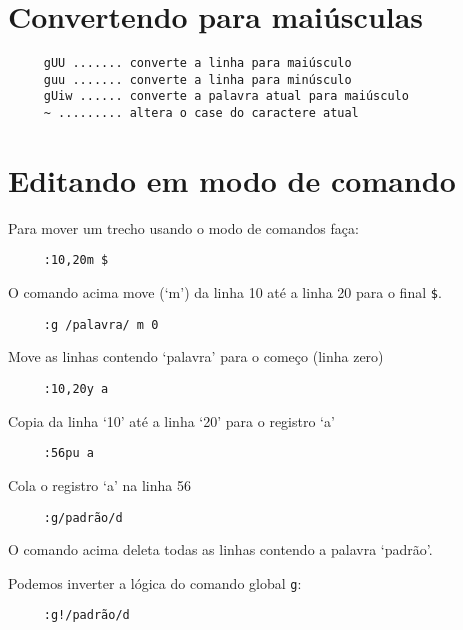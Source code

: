 \section{Convertendo para maiúsculas}
\label{sec:Convertendo para maiúsculas}

\begin{verbatim}
     gUU ....... converte a linha para maiúsculo
     guu ....... converte a linha para minúsculo
     gUiw ...... converte a palavra atual para maiúsculo
     ~ ......... altera o case do caractere atual
\end{verbatim}


\section{Editando em modo de comando}
\label{sec:Editando em modo de comando}

Para mover um trecho usando o modo de comandos faça:

\begin{verbatim}
     :10,20m $
\end{verbatim}

O comando acima move (`m') da linha 10 até a linha 20 para o final \verb|$|.

\begin{verbatim}
     :g /palavra/ m 0
\end{verbatim}

Move as linhas contendo `palavra' para o começo (linha zero)


\begin{verbatim}
     :10,20y a
\end{verbatim}

Copia da linha `10' até a linha `20' para o registro `a'

\begin{verbatim}
     :56pu a
\end{verbatim}

Cola o registro `a' na linha 56

\begin{verbatim}
     :g/padrão/d
\end{verbatim}

O comando acima deleta todas as linhas contendo a palavra `padrão'.

Podemos inverter a lógica do comando global \verb+g+:

\begin{verbatim}
     :g!/padrão/d
\end{verbatim}


